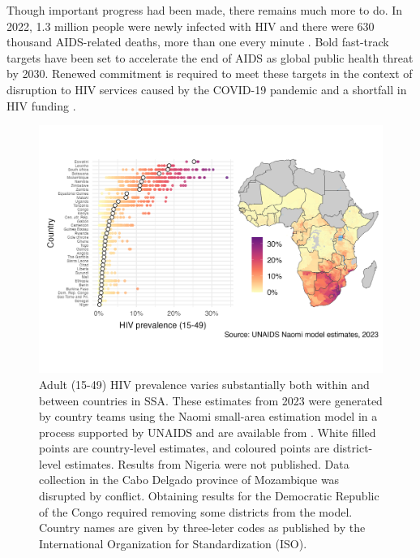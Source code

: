 \documentclass[a4paper, nobind]{templates/ociamthesis}
\begin{document}
Though important progress had been made, there remains much more to do.
In 2022, 1.3 million people were newly infected with HIV and there were 630 thousand AIDS-related deaths, more than one every minute \autocite{unaids2022global}.
Bold fast-track targets have been set to accelerate the end of AIDS as global public health threat by 2030.
Renewed commitment is required to meet these targets in the context of disruption to HIV services caused by the COVID-19 pandemic and a shortfall in HIV funding \autocite{economist2023triple}.



\begin{figure}

{\centering \includegraphics[width=0.95\linewidth]{figures/hiv-aids/naomi-continent} 

}

\caption{Adult (15-49) HIV prevalence varies substantially both within and between countries in SSA. These estimates from 2023 were generated by country teams using the Naomi small-area estimation model in a process supported by UNAIDS and are available from \textcite{unaids2023aidsinfo}. White filled points are country-level estimates, and coloured points are district-level estimates. Results from Nigeria were not published. Data collection in the Cabo Delgado province of Mozambique was disrupted by conflict. Obtaining results for the Democratic Republic of the Congo required removing some districts from the model. Country names are given by three-leter codes as published by the International Organization for Standardization (ISO).}\label{fig:naomi-continent}
\end{figure}
\end{document}
